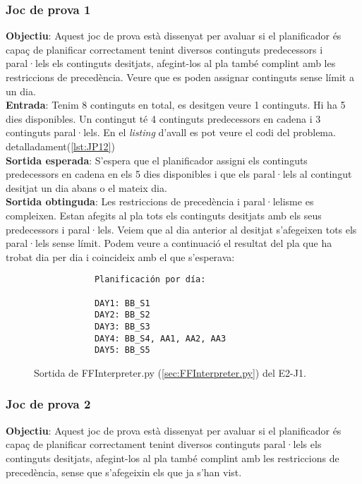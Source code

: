 \documentclass[a4paper]{article}
\begin{document}
	\subsubsection*{Joc de prova 1}
	\noindent \textbf{Objectiu}: Aquest joc de prova està dissenyat per avaluar si el planificador és capaç de planificar correctament tenint diversos continguts predecessors i paral·lels els continguts desitjats, afegint-los al pla també complint amb les restriccions de precedència. Veure que es poden assignar continguts sense límit a un dia. \\
	
	\noindent \textbf{Entrada}: Tenim 8 continguts en total, es desitgen veure 1 continguts. Hi ha 5 dies disponibles. Un contingut té 4 continguts predecessors en cadena i 3 continguts paral·lels. En el \textit{listing} d'avall es pot veure el codi del problema.  detalladament(\ref{lst:JP12}) \\
	
	\noindent \textbf{Sortida esperada}: S'espera que el planificador assigni els continguts predecessors en cadena en els 5 dies disponibles i que els paral·lels al contingut desitjat un dia abans o el mateix dia. \\
	
	\noindent \textbf{Sortida obtinguda}: Les restriccions de precedència i paral·lelisme es compleixen.  Estan afegits al pla tots els continguts desitjats amb els seus predecessors i paral·lels. Veiem que al dia anterior al desitjat s'afegeixen tots els paral·lels sense límit. Podem veure a continuació el resultat del pla que ha trobat dia per dia i coincideix amb el que s'esperava:
	
	\begin{figure}[H]
		\centering
		\begin{verbatim}
			Planificación por día:
			
			DAY1: BB_S1
			DAY2: BB_S2
			DAY3: BB_S3
			DAY4: BB_S4, AA1, AA2, AA3
			DAY5: BB_S5
		\end{verbatim}
		\caption{Sortida de FFInterpreter.py (\ref{sec:FFInterpreter.py}) del E2-J1.}
	\end{figure}
	
	\subsubsection*{Joc de prova 2}
	\noindent \textbf{Objectiu}: Aquest joc de prova està dissenyat per avaluar si el planificador és capaç de planificar correctament tenint diversos continguts paral·lels els continguts desitjats, afegint-los al pla també complint amb les restriccions de precedència, sense que s'afegeixin els que ja s'han vist. \\
	
\end{document}
